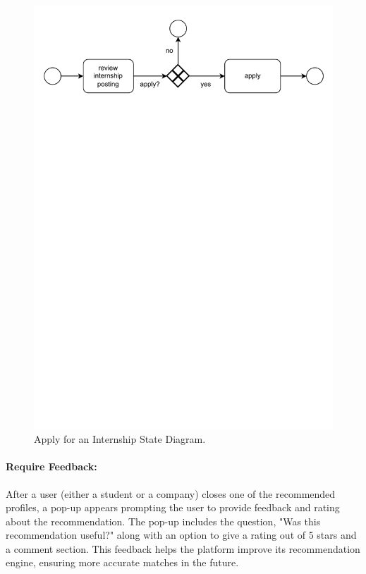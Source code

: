 \begin{figure}[H]
    \begin{center}
        \includegraphics[width=\linewidth]{Images/StateDiagram/Apply.pdf}
        \caption{Apply for an Internship State Diagram.}
        \label{fig:Apply_state_diag}%
    \end{center}
\end{figure}

\paragraph{Require Feedback:} After a user (either a student or a
  company) closes one of the recommended profiles, a pop-up appears
  prompting the user to provide feedback and rating about the
  recommendation. The pop-up includes the question, "Was this recommendation useful?" along with an option to give a rating out of 5 stars and a comment section. This feedback helps the platform improve its recommendation engine, ensuring more accurate matches in the future.

